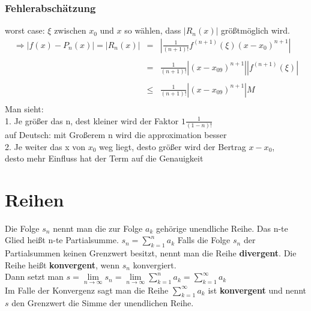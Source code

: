 \documentclass[12pt,a4paper]{article}
\begin{document}
\subsubsection{Fehlerabschätzung}
worst case: $\xi$ zwischen $x_0$ und $x$ so wählen, dass $|R_n(x)|$ größtmöglich wird.\\
$$
\begin{matrix}
\Rightarrow\left|f(x)-P_n(x)\right|=\left|R_n(x)\right| &=& \left|\frac{1}{\left(n+1\right)!}f^{(n+1)}(\xi)\left(x-x_0\right)^{n+1}\right| \\
\\
&=& \frac{1}{\left(n+1\right)!}\left|\left(x-x_09\right)^{n+1}\right|\left|f^{(n+1)}(\xi)\right| \\
\\
&\leq& \frac{1}{\left(n+1\right)!}\left|\left(x-x_09\right)^{n+1}\right| M \\
\end{matrix}
$$
\newpage
Man sieht:\\
1. Je größer das n, dest kleiner wird der Faktor $1\frac{1}{(1-n)!}$\\
auf Deutsch: mit Großerem n wird die approximation besser\\
2. Je weiter das x von $x_0$ weg liegt, desto größer wird der Bertrag $x-x_0$, \\
desto mehr Einfluss hat der Term auf die Genauigkeit\\
\section{Reihen}
Die Folge $s_n$ nennt man die zur Folge $a_k$ gehörige unendliche
Reihe. Das n-te Glied heißt n-te Partialsumme.
$s_n=\sum\limits_{k=1}^{n}a_k$
Falls die Folge $s_n$ der Partialsummen keinen Grenzwert
besitzt, nennt man die Reihe \textbf{divergent}.
Die Reihe heißt \textbf{konvergent}, wenn $s_n$ konvergiert. 
\\Dann setzt man
$s=\lim\limits_{n\rightarrow \infty}s_n=\lim\limits_{n\rightarrow \infty}\sum\limits_{k=1}^{n}a_k=\sum\limits_{k=1}^{\infty}a_k$
\\Im Falle der Konvergenz sagt man die Reihe $\sum\limits_{k=1}^{\infty}a_k$ ist \textbf{konvergent} und nennt $s$ den Grenzwert die Simme der unendlichen Reihe. 
\end{document}
